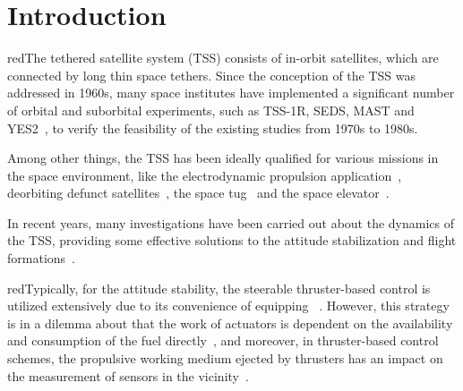 \section{Introduction}
\begin{color}{red}The tethered satellite system (TSS) consists of in-orbit satellites, which are connected by long thin space tethers. Since the conception of the TSS was addressed in 1960s, many space institutes have implemented a significant number of orbital and suborbital experiments, such as TSS-1R, SEDS, MAST and YES2~\cite{williams2012review}, to verify the feasibility of the existing studies from 1970s to 1980s. \end{color}Among other things, the TSS has been ideally qualified for various missions in the space environment, like the electrodynamic propulsion application~\cite{lanoix2005effect}, deorbiting defunct satellites~\cite{khan2014analysis}, the space tug~\cite{wen2016constrained} and the space elevator~\cite{kojima2015mission}.\par
In recent years, many investigations have been carried out about the dynamics of the TSS, providing some effective solutions to the attitude stabilization and flight formations~\cite{misra2002equilibrium,yan2012feedback,xu2012nonlinear,zhu2015dynamic,hallaj2015tethered,alary2015dynamics,wang2015coordinated,ting2016reconfiguration,cicci2016preliminary}. \begin{color}{red}Typically, for the attitude stability, the steerable thruster-based control is utilized extensively due to its convenience of equipping ~\cite{aslanov2013dynamics,jasper2014input,jasper2014tethered,aslanov2014dynamics}. However, this strategy is in a dilemma about that the work of actuators is dependent on the availability and consumption of the fuel directly~\cite{chung2008propellant1}, and moreover, in thruster-based control schemes,  the propulsive working medium ejected by thrusters has an impact on the measurement of sensors in the vicinity~\cite{hallaj2015tethered}.\end{color}\par
